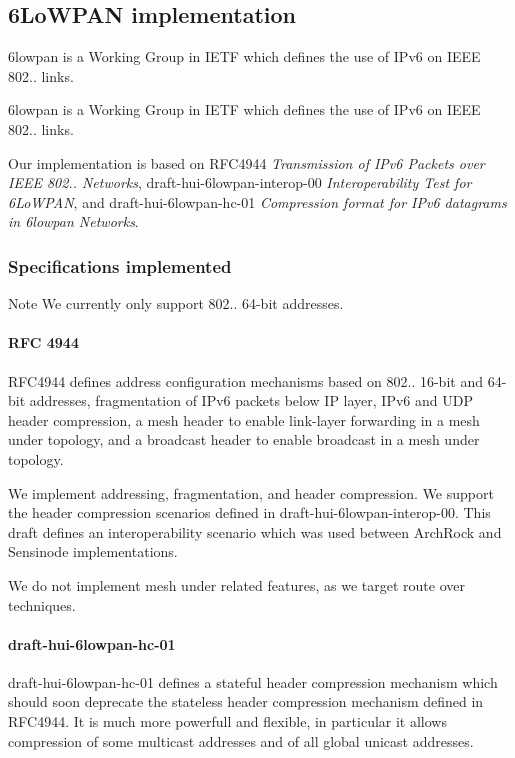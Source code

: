 \hypertarget{a00070}{}\subsection{6\+Lo\+W\+P\+AN implementation}
\label{a00070}


6lowpan is a Working Group in I\+E\+TF which defines the use of I\+Pv6 on I\+E\+EE 802.. links.  


6lowpan is a Working Group in I\+E\+TF which defines the use of I\+Pv6 on I\+E\+EE 802.. links. 

Our implementation is based on R\+F\+C4944 {\itshape Transmission of I\+Pv6 Packets over I\+E\+EE 802.. Networks}, draft-\/hui-\/6lowpan-\/interop-\/00 {\itshape Interoperability Test for 6\+Lo\+W\+P\+AN}, and draft-\/hui-\/6lowpan-\/hc-\/01 {\itshape Compression format for I\+Pv6 datagrams in 6lowpan Networks}.



\hypertarget{a00070_drafts}{}\subsubsection{Specifications implemented}\label{a00070_drafts}
\begin{DoxyNote}{Note}
We currently only support 802.. 64-\/bit addresses.
\end{DoxyNote}
\hypertarget{a00070_rfc4944}{}\paragraph{R\+F\+C 4944}\label{a00070_rfc4944}
R\+F\+C4944 defines address configuration mechanisms based on 802.. 16-\/bit and 64-\/bit addresses, fragmentation of I\+Pv6 packets below IP layer, I\+Pv6 and U\+DP header compression, a mesh header to enable link-\/layer forwarding in a mesh under topology, and a broadcast header to enable broadcast in a mesh under topology.

We implement addressing, fragmentation, and header compression. We support the header compression scenarios defined in draft-\/hui-\/6lowpan-\/interop-\/00. This draft defines an interoperability scenario which was used between Arch\+Rock and Sensinode implementations.

We do not implement mesh under related features, as we target route over techniques.\hypertarget{a00070_hc01}{}\paragraph{draft-\/hui-\/6lowpan-\/hc-\/01}\label{a00070_hc01}
draft-\/hui-\/6lowpan-\/hc-\/01 defines a stateful header compression mechanism which should soon deprecate the stateless header compression mechanism defined in R\+F\+C4944. It is much more powerfull and flexible, in particular it allows compression of some multicast addresses and of all global unicast addresses.



